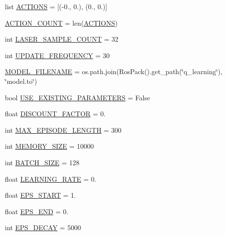 \begin{DoxyCompactItemize}
\item 
list \hyperlink{namespaceparameters_a585a25d0a26bcab4242d2e3fb1c1f93e}{A\+C\+T\+I\+O\+NS} = \mbox{[}(-\/0., 0.), (0., 0.)\mbox{]}
\item 
\hyperlink{namespaceparameters_ae4be13f6dac91f471da3efb4618a54c1}{A\+C\+T\+I\+O\+N\+\_\+\+C\+O\+U\+NT} = len(\hyperlink{namespaceparameters_a585a25d0a26bcab4242d2e3fb1c1f93e}{A\+C\+T\+I\+O\+NS})
\item 
int \hyperlink{namespaceparameters_a24735dce78cf9899cf1ec4bda2ea4eac}{L\+A\+S\+E\+R\+\_\+\+S\+A\+M\+P\+L\+E\+\_\+\+C\+O\+U\+NT} = 32
\item 
int \hyperlink{namespaceparameters_ae3bc06467bd63647dbed9a5312495493}{U\+P\+D\+A\+T\+E\+\_\+\+F\+R\+E\+Q\+U\+E\+N\+CY} = 30
\item 
\hyperlink{namespaceparameters_aff8b0668384f3fa2d1212d3bd0ff42fa}{M\+O\+D\+E\+L\+\_\+\+F\+I\+L\+E\+N\+A\+ME} = os.\+path.\+join(Ros\+Pack().get\+\_\+path(\char`\"{}q\+\_\+learning\char`\"{}), \char`\"{}model.\+to\char`\"{})
\item 
bool \hyperlink{namespaceparameters_a0cffcb215ac12a1700baedb1a13ec8d5}{U\+S\+E\+\_\+\+E\+X\+I\+S\+T\+I\+N\+G\+\_\+\+P\+A\+R\+A\+M\+E\+T\+E\+RS} = False
\item 
float \hyperlink{namespaceparameters_a70176024e0f585c846365800f1c7819c}{D\+I\+S\+C\+O\+U\+N\+T\+\_\+\+F\+A\+C\+T\+OR} = 0.
\item 
int \hyperlink{namespaceparameters_aa473cc3b100416af3310c6c5a6d19570}{M\+A\+X\+\_\+\+E\+P\+I\+S\+O\+D\+E\+\_\+\+L\+E\+N\+G\+TH} = 300
\item 
int \hyperlink{namespaceparameters_a49f1ad074b5710a98fc783c5627ddade}{M\+E\+M\+O\+R\+Y\+\_\+\+S\+I\+ZE} = 10000
\item 
int \hyperlink{namespaceparameters_a2d37d9950f7a887014021ab455282af6}{B\+A\+T\+C\+H\+\_\+\+S\+I\+ZE} = 128
\item 
float \hyperlink{namespaceparameters_afb996d542e8c3d3e8bbdfe4a711694dd}{L\+E\+A\+R\+N\+I\+N\+G\+\_\+\+R\+A\+TE} = 0.
\item 
float \hyperlink{namespaceparameters_a371d0de003e9046dcc72450b7512ce14}{E\+P\+S\+\_\+\+S\+T\+A\+RT} = 1.
\item 
float \hyperlink{namespaceparameters_a3765f189d3af4815766ded3bffcba1e2}{E\+P\+S\+\_\+\+E\+ND} = 0.
\item 
int \hyperlink{namespaceparameters_ab9a88c663385563b35331bbea5c4a74b}{E\+P\+S\+\_\+\+D\+E\+C\+AY} = 5000
\end{DoxyCompactItemize}


